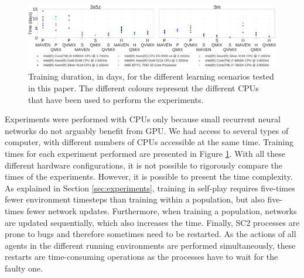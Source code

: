 \begin{figure}[ht]
    \centering
    \includegraphics[width=\textwidth]{tex_thesis/figures/ch7/training_time.pdf}
    \caption{Training duration, in days, for the different learning scenarios tested in this paper.
    The different colours represent the different CPUs that have been used to perform the experiments.}
    \label{fig:training_time}
\end{figure}

Experiments were performed with CPUs only because small recurrent neural networks do not arguably benefit from GPU.
We had access to several types of computer, with different numbers of CPUs accessible at the same time.
Training times for each experiment performed are presented in Figure \ref{fig:training_time}.
With all these different hardware configurations, it is not possible to rigorously compare the times of the experiments.
However, it is possible to present the time complexity.
As explained in Section \ref{sec:experiments}, training in self-play requires five-times fewer environment timesteps than training within a population, but also five-times fewer network updates.
Furthermore, when training a population, networks are updated sequentially, which also increases the time.
Finally, SC2 processes are prone to bugs and therefore sometimes need to be restarted.
As the actions of all agents in the different running environments are performed simultaneously, these restarts are time-consuming operations as the processes have to wait for the faulty one.
